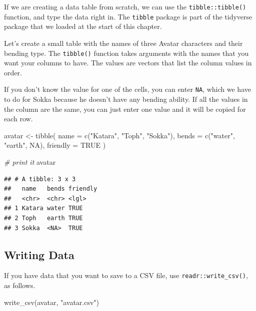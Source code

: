 \documentclass[
  oneside]{book}
\newenvironment{Shaded}{\begin{snugshade}}{\end{snugshade}}
\newcommand{\AttributeTok}[1]{\textcolor[rgb]{0.77,0.63,0.00}{#1}}
\newcommand{\CommentTok}[1]{\textcolor[rgb]{0.56,0.35,0.01}{\textit{#1}}}
\newcommand{\ConstantTok}[1]{\textcolor[rgb]{0.00,0.00,0.00}{#1}}
\newcommand{\FunctionTok}[1]{\textcolor[rgb]{0.00,0.00,0.00}{#1}}
\newcommand{\NormalTok}[1]{#1}
\newcommand{\OtherTok}[1]{\textcolor[rgb]{0.56,0.35,0.01}{#1}}
\newcommand{\StringTok}[1]{\textcolor[rgb]{0.31,0.60,0.02}{#1}}
\begin{document}
If we are creating a data table from scratch, we can use the \texttt{tibble::tibble()} function, and type the data right in. The \texttt{tibble} package is part of the tidyverse package that we loaded at the start of this chapter.

Let's create a small table with the names of three Avatar characters and their bending type. The \texttt{tibble()} function takes arguments with the names that you want your columns to have. The values are vectors that list the column values in order.

If you don't know the value for one of the cells, you can enter \texttt{NA}, which we have to do for Sokka because he doesn't have any bending ability. If all the values in the column are the same, you can just enter one value and it will be copied for each row.

\begin{Shaded}
\begin{Highlighting}[]
\NormalTok{avatar }\OtherTok{\textless{}{-}} \FunctionTok{tibble}\NormalTok{(}
  \AttributeTok{name =} \FunctionTok{c}\NormalTok{(}\StringTok{"Katara"}\NormalTok{, }\StringTok{"Toph"}\NormalTok{, }\StringTok{"Sokka"}\NormalTok{),}
  \AttributeTok{bends =} \FunctionTok{c}\NormalTok{(}\StringTok{"water"}\NormalTok{, }\StringTok{"earth"}\NormalTok{, }\ConstantTok{NA}\NormalTok{),}
  \AttributeTok{friendly =} \ConstantTok{TRUE}
\NormalTok{)}

\CommentTok{\# print it}
\NormalTok{avatar}
\end{Highlighting}
\end{Shaded}

\begin{verbatim}
## # A tibble: 3 x 3
##   name   bends friendly
##   <chr>  <chr> <lgl>   
## 1 Katara water TRUE    
## 2 Toph   earth TRUE    
## 3 Sokka  <NA>  TRUE
\end{verbatim}

\hypertarget{writing-data}{%
\subsection{Writing Data}\label{writing-data}}

If you have data that you want to save to a CSV file, use \texttt{readr::write\_csv()}, as follows.

\begin{Shaded}
\begin{Highlighting}[]
\FunctionTok{write\_csv}\NormalTok{(avatar, }\StringTok{"avatar.csv"}\NormalTok{)}
\end{Highlighting}
\end{Shaded}
\end{document}
